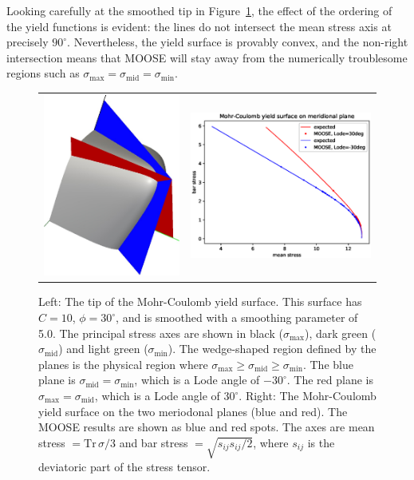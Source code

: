 \documentclass[]{scrreprt}
\newcommand{\tr}{\mbox{Tr}\,}
\newcommand{\smax}{\sigma_{\mathrm{max}}}
\newcommand{\smid}{\sigma_{\mathrm{mid}}}
\newcommand{\smin}{\sigma_{\mathrm{min}}}
\begin{document}
Looking carefully at the smoothed tip in
Figure~\ref{mc.meridional.fig}, the effect of the ordering of
the yield functions is evident: the lines do not intersect the
mean stress axis at precisely $90^{\circ}$.  Nevertheless, the
yield surface is provably convex, and the non-right intersection means
that MOOSE will stay away from the numerically troublesome regions
such as $\smax=\smid=\smin$.


\begin{figure}[htb]
  \begin{center}
    \begin{tabular}{ll}
\includegraphics[width=6cm]{capped_mc_mc_with_planes.eps} &
\includegraphics[width=8cm]{small_deform_23_24.eps}
\end{tabular}
\caption{Left: The tip of the Mohr-Coulomb yield surface.  This
  surface has $C=10$, $\phi=30^{\circ}$, and is smoothed with a
  smoothing parameter of 5.0.  The principal stress axes are shown in
  black ($\smax$), dark green ($\smid$) and light green ($\smin$).
  The wedge-shaped region defined by the planes is the physical region
  where $\smax\geq\smid\geq\smin$.  The blue plane is $\smid=\smin$,
  which is a Lode angle of $-30^{\circ}$.  The red plane is
  $\smax=\smid$, which is a Lode angle of $30^{\circ}$.  Right: The
  Mohr-Coulomb yield surface on the two meriodonal planes (blue and
  red).  The MOOSE results are shown as blue and red spots.  The axes
  are mean stress $ = \tr\sigma/3$ and bar stress
  $=\sqrt{s_{ij}s_{ij}/2}$, where $s_{ij}$ is the deviatoric part of
  the stress tensor.}
\label{mc.meridional.fig}
\end{center}
\end{figure}
\end{document}
